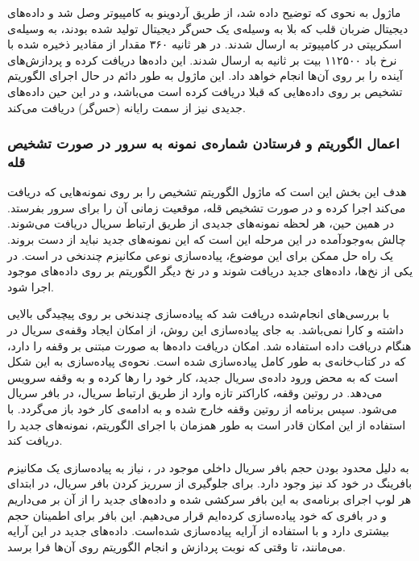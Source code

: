 ماژول  به نحوی که توضیح داده شد، از طریق آردوینو به کامپیوتر وصل شد و داده‌های دیجیتال ضربان قلب که بلا به وسیله‌ی یک حس‌گر دیجیتال تولید شده بودند،‌ به وسیله‌ی اسکریپتی در کامپیوتر به  ارسال شدند. در هر ثانیه ۳۶۰ مقدار از مقادیر ذخیره شده با نرخ باد ۱۱۲۵۰۰ بیت بر ثانیه به  ارسال شدند.  این داده‌ها دریافت کرده و پردازش‌های آینده را بر روی آن‌ها انجام خواهد داد. این ماژول به طور دائم در حال اجرای الگوریتم تشخیص  بر روی داده‌هایی که قبلا دریافت کرده است می‌باشد، و در این حین داده‌های جدیدی نیز از سمت رایانه (حس‌گر) دریافت می‌کند.
\subsubsection{اعمال الگوریتم و فرستادن شماره‌ی نمونه به  سرور
 در صورت تشخیص قله}
	 هدف این بخش این است که  ماژول  الگوریتم تشخیص  را بر روی نمونه‌هایی که دریافت می‌کند اجرا کرده و در صورت تشخیص قله، موقعیت زمانی آن را برای سرور بفرستد. در همین حین، هر لحظه نمونه‌های جدیدی از طریق ارتباط سریال دریافت می‌شوند. چالش به‌وجودآمده در این مرحله این است که این نمونه‌های جدید نباید از دست بروند. یک راه حل ممکن برای این موضوع،‌ پیاده‌سازی نوعی مکانیزم چندنخی در  است. در یکی از نخ‌ها، داده‌های جدید دریافت شوند و در نخ دیگر الگوریتم بر روی داده‌‌های موجود اجرا شود.
	 
با بررسی‌های انجام‌شده دریافت شد که پیاده‌سازی چندنخی بر روی  پیچیدگی بالایی داشته و کارا نمی‌باشد. به جای پیاده‌سازی این روش، از امکان ایجاد وقفه‌ی سریال در هنگام دریافت داده استفاده شد.  امکان دریافت داده‌ها به صورت مبتنی بر وقفه را دارد، که در کتاب‌خانه‌ی  به طور کامل پیاده‌سازی شده است. نحوه‌ی پیاده‌سازی به این شکل است که به محض ورود داده‌ی سریال جدید،  کار خود را رها کرده و به وقفه سرویس می‌دهد. در روتین وقفه، کاراکتر تازه وارد از طریق ارتباط سریال، در بافر سریال  می‌شود. سپس برنامه از روتین وقفه خارج شده و به ادامه‌ی کار خود باز می‌گردد. با استفاده از این امکان  قادر است به طور همزمان با اجرای الگوریتم، نمونه‌های جدید را دریافت کند.

 به دلیل محدود بودن حجم بافر سریال داخلی موجود در ، نیاز به پیاده‌سازی یک مکانیزم بافرینگ در خود کد نیز وجود دارد. برای جلوگیری از سرریز کردن بافر سریال، در ابتدای هر لوپ اجرای برنامه‌ی  به این بافر سرکشی شده و داده‌های جدید را از آن بر می‌داریم و در بافری که خود پیاده‌سازی کرده‌ایم قرار می‌دهیم. این بافر برای اطمینان حجم بیشتری دارد و با استفاده از آرایه پیاده‌سازی شده‌است. داده‌های جدید در این آرایه می‌مانند، تا وقتی که نوبت پردازش و انجام الگوریتم روی آن‌ها فرا برسد.

